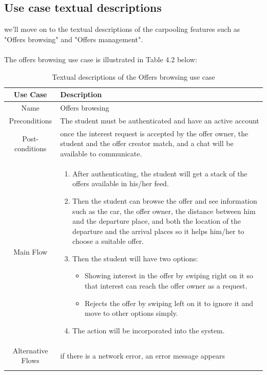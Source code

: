 \subsection{Use case textual descriptions}
we'll move on to the textual descriptions of the carpooling features such as "Offers browsing" and "Offers management". \\ \\
The offers browsing use case is illustrated in Table 4.2 below:
\begin{longtable}{|c|p{10cm}|}
\hline
Use Case & Description \\\hline
Name & Offers browsing \\\hline
Preconditions & The student must be authenticated and have an active account \\\hline
Post-conditions & once the interest request is accepted by the offer owner, the student and the offer creator match, and a chat will be available to communicate. \\ \hline
Main Flow & 
\begin{enumerate}
    \item After authenticating, the student will get a stack of the offers available in his/her feed.
    \item   Then the student can browse the offer and see information such as the car, the offer owner, the distance between him and the departure place, and both the location of the departure and the arrival places so it helps him/her to choose a suitable offer.
    \item Then the student will have two options:
        \begin{itemize}
            \item   Showing interest in the offer by swiping right on it so that interest can reach the offer owner as a request.
            \item Rejects the offer by swiping left on it to ignore it and move to other options simply.
        \end{itemize} 
        \item The action will be incorporated into the system. 
\end{enumerate}
\\\hline
Alternative Flows & 
    if there is a network error, an error message appears
\\\hline
\caption{Textual descriptions of the Offers browsing use case}
\label{Tab: Textual descriptions of the Offers browsing use case}
\end{longtable}

